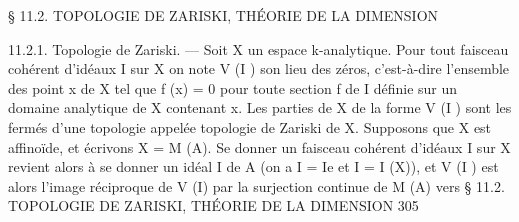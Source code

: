 \documentclass[
  10pt,
]{article}
\newenvironment{Shaded}{}{}
\newcommand{\NormalTok}[1]{#1}
\begin{document}
\begin{Shaded}
\begin{Highlighting}[]
\NormalTok{      § 11.2. TOPOLOGIE DE ZARISKI, THÉORIE DE LA DIMENSION}

\NormalTok{11.2.1. Topologie de Zariski. — Soit X un espace k{-}analytique. Pour tout faisceau}
\NormalTok{cohérent d’idéaux I sur X on note V (I ) son lieu des zéros, c’est{-}à{-}dire l’ensemble}
\NormalTok{des point x de X tel que f (x) = 0 pour toute section f de I définie sur un domaine}
\NormalTok{analytique de X contenant x. Les parties de X de la forme V (I ) sont les fermés d’une}
\NormalTok{topologie appelée topologie de Zariski de X.}
\NormalTok{   Supposons que X est affinoïde, et écrivons X = M (A). Se donner un faisceau cohérent}
\NormalTok{d’idéaux I sur X revient alors à se donner un idéal I de A (on a I = Ie et I = I (X)),}
\NormalTok{et V (I ) est alors l’image réciproque de V (I) par la surjection continue de M (A) vers}
\NormalTok{                § 11.2. TOPOLOGIE DE ZARISKI, THÉORIE DE LA DIMENSION               305}


\end{Highlighting}
\end{Shaded}
\end{document}
